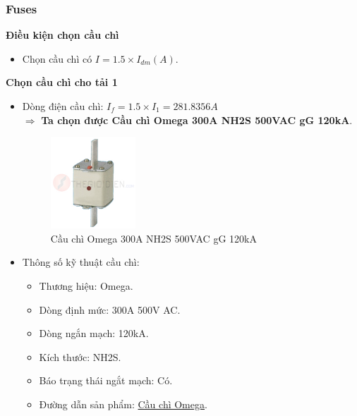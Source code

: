         \subsubsection{Fuses}
            \textbf{Điều kiện chọn cầu chì}
                \begin{itemize}
                    \item Chọn cầu chì có $I = 1.5 \times I_{dm} (A)$.
                \end{itemize}
            \textbf{Chọn cầu chì cho tải 1}
                \begin{itemize}
                    \item Dòng điện cầu chì: $I_{f} = 1.5 \times I_{1} = 281.8356A$ \\[0.2cm]
                        $\Rightarrow$ \textbf{Ta chọn được Cầu chì Omega 300A NH2S 500VAC gG 120kA}.
                        \begin{figure}[H]
                            \centering
                            \includegraphics[width=0.3\textwidth]{pictures/2e.png}
                            \caption{Cầu chì Omega 300A NH2S 500VAC gG 120kA}
                        \end{figure}
                    \item Thông số kỹ thuật cầu chì:
                        \begin{itemize}
                            \item Thương hiệu: Omega.
                            \item Dòng định mức: 300A 500V AC.
                            \item Dòng ngắn mạch: 120kA.
                            \item Kích thước: NH2S.
                            \item Báo trạng thái ngắt mạch: Có.
                            \item Đường dẫn sản phẩm: \href{https://www.thegioidien.com/sanpham/5/20817/Cau-chi-300A-NH2S-500VAC-gG-120kA.aspx}{Cầu chì Omega}.
                        \end{itemize}
                \end{itemize}
